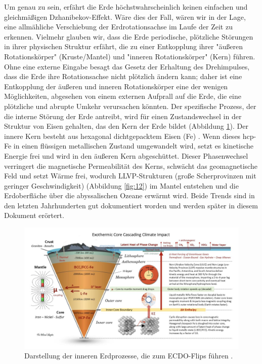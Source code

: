 \documentclass[10pt,twocolumn,letterpaper]{article}
\begin{document}
Um genau zu sein, erfährt die Erde höchstwahrscheinlich keinen einfachen und gleichmäßigen Dzhanibekov-Effekt. Wäre dies der Fall, wären wir in der Lage, eine allmähliche Verschiebung der Erdrotationsachse im Laufe der Zeit zu erkennen. Vielmehr glauben wir, dass die Erde periodische, plötzliche Störungen in ihrer physischen Struktur erfährt, die zu einer Entkopplung ihrer "äußeren Rotationskörper" (Kruste/Mantel) und "inneren Rotationskörper" (Kern) führen. Ohne eine externe Eingabe besagt das Gesetz der Erhaltung des Drehimpulses, dass die Erde ihre Rotationsachse nicht plötzlich ändern kann; daher ist eine Entkopplung der äußeren und inneren Rotationskörper eine der wenigen Möglichkeiten, abgesehen von einem externen Aufprall auf die Erde, die eine plötzliche und abrupte Umkehr verursachen könnten.
Der spezifische Prozess, der die interne Störung der Erde antreibt, wird für einen Zustandswechsel in der Struktur von Eisen gehalten, das den Kern der Erde bildet (Abbildung \ref{fig:11}). Der innere Kern besteht aus hexagonal dichtgepacktem Eisen (Fe) \cite{141}. Wenn dieses hcp-Fe in einen flüssigen metallischen Zustand umgewandelt wird, setzt es kinetische Energie frei und wird in den äußeren Kern abgeschüttet. Dieser Phasenwechsel verringert die magnetische Permeabilität des Kerns, schwächt das geomagnetische Feld und setzt Wärme frei, wodurch LLVP-Strukturen (große Scherprovinzen mit geringer Geschwindigkeit) (Abbildung \ref{fig:12}) \cite{38} im Mantel entstehen und die Erdoberfläche über die abyssalischen Ozeane erwärmt wird. Beide Trends sind in den letzten Jahrhunderten gut dokumentiert worden und werden später in diesem Dokument erörtert.

\begin{figure}[t]
\begin{center}
\includegraphics[width=1\textwidth]{layers.jpg}
\end{center}
   \caption{Darstellung der inneren Erdprozesse, die zum ECDO-Flips führen \cite{129}.}
\label{fig:11}
\end{figure}
\end{document}
